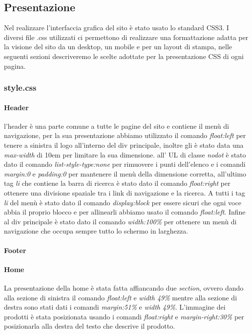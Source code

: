 \subsection{Presentazione}
Nel realizzare l'interfaccia grafica del sito è stato usato lo standard CSS3.\newline
I diversi file .css utilizzati ci permettono di realizzare una formattazione adatta per la visione del sito da un desktop, un mobile e per un layout di stampa, nelle seguenti sezioni descriveremo le scelte adottate per la presentazione CSS di ogni pagina.

\subsubsection{style.css}

\paragraph{Header} \mbox{}
l'header è una parte comune a tutte le pagine del sito e contiene il menù di navigazione, per la sua presentazione abbiamo utilizzato il comando \emph{float:left} per tenere a sinistra il logo all'interno del div principale, inoltre gli è stato data una \emph{max-width} di 10em per limitare la sua dimensione. all' UL di classe \emph{nodot} è stato dato il comando \emph{list-style-type:none} per rimuovere i punti dell'elenco e i comandi \emph{margin:0} e \emph{padding:0} per mantenere il menù della dimensione corretta, all'ultimo tag \emph{li} che contiene la barra di ricerca è stato dato il comando \emph{float:right} per ottenere una divisione spaziale tra i link di navigazione e la ricerca.
A tutti i tag \emph{li} del menù è stato dato il comando \emph{display:block} per essere sicuri che ogni voce abbia il proprio blocco e per allinearli abbiamo usato il comando \emph{float:left}.
Infine al div principale è stato dato il comando \emph{width:100\%} per ottenere un menù di navigazione che occupa sempre tutto lo schermo in larghezza.

\paragraph{Footer} \mbox{}



\paragraph{Home} \mbox{}
La presentazione della home è stata fatta affiancando due \emph{section}, ovvero dando alla sezione di sinistra il comando \emph{float:left} e \emph{width 49\%} mentre alla sezione di destra sono stati dati i comandi \emph{margin:51\%} e \emph{width 49\%}. 
L'immagine dei prodotti è stata posizionata usando i comandi \emph{float:right} e \emph{margin-right:30\%} per posizionarla alla destra del testo che descrive il prodotto.